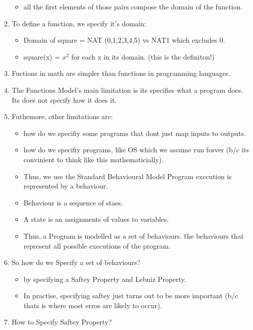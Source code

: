 \documentclass{article}
\begin{document}
\begin{enumerate}
\begin{itemize}
            \item all the first elements of those pairs compose the domain of the function. 
            \end{itemize} 
        \item To define a function, we specify it's domain: \begin{itemize}
            \item Domain of square = NAT (0,1,2,3,4,5) vs NAT1 which excludes 0.
            \item square(x) = $x^2$ for each x in its domain. (this is the definiton!)
            \end{itemize}
        \item Fuctions in math are simpler than functions in programming languages.
        \item The Functions Model's main limitation is \= its specifies what a program does. Its does not specify how it does it.
        \item Futhemore, other limitations are: \begin{itemize}
            \item how do we specifiy some programs that dont just map inputs to outputs.
            \item how do we specifiy programs, like OS which we assume run forver (b/c its convinient to think like this mathematicially).
            \item Thus, we use the Standard Behavioural Model \= Program execution is represented by a behaviour.
            \item Behaviour is a sequence of staes.
            \item A state is an assignments of values to variables. 
            \item Thus, a Program is modelled as a set of behaviours. \=  the behaviours that represent all possible executions of the program.
            \end{itemize}
        \item So how do we Specify a set of behaviours? \begin{itemize}
            \item by specifying a Saftey Property and Lebniz Property.
            \item In practise, specifying saftey just turns out to be more important (b/c thats is where most erros are likely to occur).
        \end{itemize}
        \item How to Specify Saftey Property? \begin{itemize}

\end{itemize}
\end{enumerate}
\end{document}
